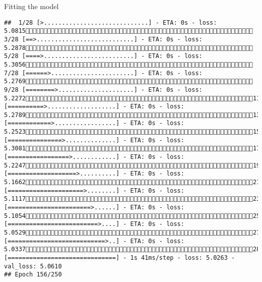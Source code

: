 \documentclass[
  ignorenonframetext,
]{beamer}
\begin{document}
\begin{frame}[fragile]{Fitting the model}
\begin{verbatim}
##  1/28 [>.............................] - ETA: 0s - loss: 5.0815 3/28 [==>...........................] - ETA: 0s - loss: 5.2878 5/28 [====>.........................] - ETA: 0s - loss: 5.3056 7/28 [======>.......................] - ETA: 0s - loss: 5.2769 9/28 [========>.....................] - ETA: 0s - loss: 5.227211/28 [==========>...................] - ETA: 0s - loss: 5.278913/28 [============>.................] - ETA: 0s - loss: 5.252315/28 [===============>..............] - ETA: 0s - loss: 5.308117/28 [=================>............] - ETA: 0s - loss: 5.224719/28 [===================>..........] - ETA: 0s - loss: 5.166221/28 [=====================>........] - ETA: 0s - loss: 5.111723/28 [=======================>......] - ETA: 0s - loss: 5.105425/28 [=========================>....] - ETA: 0s - loss: 5.052927/28 [===========================>..] - ETA: 0s - loss: 5.033728/28 [==============================] - 1s 41ms/step - loss: 5.0263 - val_loss: 5.0610
## Epoch 156/250

\end{verbatim}
\end{frame}
\end{document}
